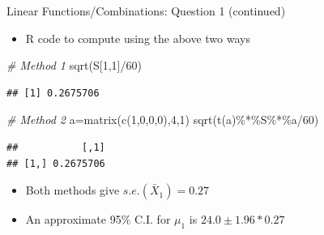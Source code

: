 \documentclass[
  ignorenonframetext,
]{beamer}
\newenvironment{Shaded}{\begin{snugshade}}{\end{snugshade}}
\newcommand{\CommentTok}[1]{\textcolor[rgb]{0.56,0.35,0.01}{\textit{#1}}}
\newcommand{\DecValTok}[1]{\textcolor[rgb]{0.00,0.00,0.81}{#1}}
\newcommand{\FunctionTok}[1]{\textcolor[rgb]{0.00,0.00,0.00}{#1}}
\newcommand{\NormalTok}[1]{#1}
\newcommand{\OtherTok}[1]{\textcolor[rgb]{0.56,0.35,0.01}{#1}}
\newcommand{\SpecialCharTok}[1]{\textcolor[rgb]{0.00,0.00,0.00}{#1}}
\providecommand{\tightlist}{%
  \setlength{\itemsep}{0pt}\setlength{\parskip}{0pt}}
\begin{document}
\begin{frame}[fragile]{Linear Functions/Combinations: Question 1
(continued)}
\protect\hypertarget{linear-functionscombinations-question-1-continued}{}
\begin{itemize}
\tightlist
\item
  R code to compute using the above two ways
\end{itemize}

\begin{Shaded}
\begin{Highlighting}[]
\CommentTok{\# Method 1}
\FunctionTok{sqrt}\NormalTok{(S[}\DecValTok{1}\NormalTok{,}\DecValTok{1}\NormalTok{]}\SpecialCharTok{/}\DecValTok{60}\NormalTok{)}
\end{Highlighting}
\end{Shaded}

\begin{verbatim}
## [1] 0.2675706
\end{verbatim}

\begin{Shaded}
\begin{Highlighting}[]
\CommentTok{\# Method 2}
\NormalTok{a}\OtherTok{=}\FunctionTok{matrix}\NormalTok{(}\FunctionTok{c}\NormalTok{(}\DecValTok{1}\NormalTok{,}\DecValTok{0}\NormalTok{,}\DecValTok{0}\NormalTok{,}\DecValTok{0}\NormalTok{),}\DecValTok{4}\NormalTok{,}\DecValTok{1}\NormalTok{)}
\FunctionTok{sqrt}\NormalTok{(}\FunctionTok{t}\NormalTok{(a)}\SpecialCharTok{\%*\%}\NormalTok{S}\SpecialCharTok{\%*\%}\NormalTok{a}\SpecialCharTok{/}\DecValTok{60}\NormalTok{)}
\end{Highlighting}
\end{Shaded}

\begin{verbatim}
##           [,1]
## [1,] 0.2675706
\end{verbatim}

\begin{itemize}
\tightlist
\item
  Both methods give \(s.e.(\bar X_1)=0.27\)
\item
  An approximate 95\% C.I. for \(\mu_1\) is \(24.0 \pm 1.96*0.27\)
\end{itemize}
\end{frame}
\end{document}
